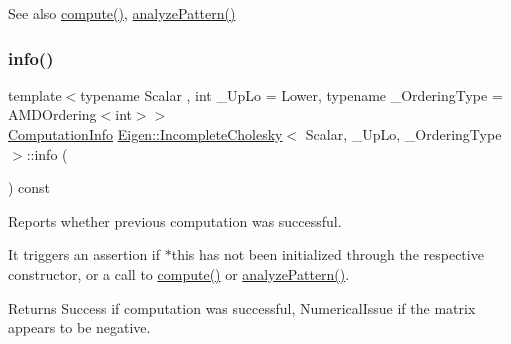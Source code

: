 \begin{DoxySeeAlso}{See also}
\mbox{\hyperlink{class_eigen_1_1_incomplete_cholesky_a7966bedeebbeaa7a8fe4dd1da3797a0b}{compute()}}, \mbox{\hyperlink{class_eigen_1_1_incomplete_cholesky_a702560ecdddef77dc51d20ab22bd974e}{analyze\+Pattern()}} 
\end{DoxySeeAlso}
\mbox{\label{class_eigen_1_1_incomplete_cholesky_ada0e68cb22601849464506f5986a88c1}} 
\subsubsection{\texorpdfstring{info()}{info()}}
{\footnotesize\ttfamily template$<$typename Scalar , int \+\_\+\+Up\+Lo = Lower, typename \+\_\+\+Ordering\+Type  = A\+M\+D\+Ordering$<$int$>$$>$ \\
\mbox{\hyperlink{group__enums_ga85fad7b87587764e5cf6b513a9e0ee5e}{Computation\+Info}} \mbox{\hyperlink{class_eigen_1_1_incomplete_cholesky}{Eigen\+::\+Incomplete\+Cholesky}}$<$ Scalar, \+\_\+\+Up\+Lo, \+\_\+\+Ordering\+Type $>$\+::info (\begin{DoxyParamCaption}{ }\end{DoxyParamCaption}) const\hspace{0.3cm}{\ttfamily [inline]}}



Reports whether previous computation was successful. 

It triggers an assertion if {\ttfamily $\ast$this} has not been initialized through the respective constructor, or a call to \mbox{\hyperlink{class_eigen_1_1_incomplete_cholesky_a7966bedeebbeaa7a8fe4dd1da3797a0b}{compute()}} or \mbox{\hyperlink{class_eigen_1_1_incomplete_cholesky_a702560ecdddef77dc51d20ab22bd974e}{analyze\+Pattern()}}.

\begin{DoxyReturn}{Returns}
{\ttfamily Success} if computation was successful, {\ttfamily Numerical\+Issue} if the matrix appears to be negative. 
\end{DoxyReturn}
\mbox{\label{class_eigen_1_1_incomplete_cholesky_a7d1f1878505fd1862e6f2286d27ff09a}} 
